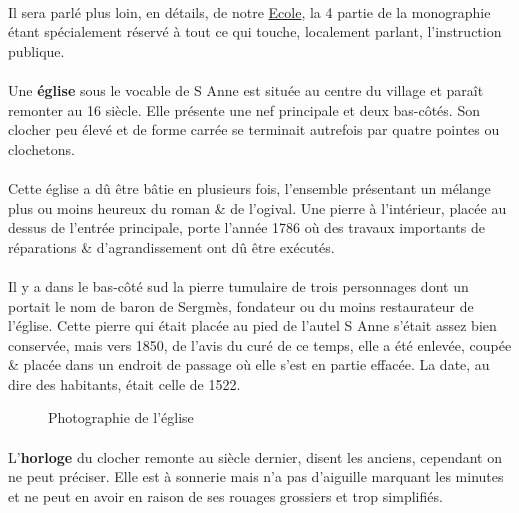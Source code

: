 \documentclass[../eBook.tex]{subfiles}
\begin{document}
    \paragraph{}Il sera parlé plus loin, en détails, de notre \underline{Ecole}, la 4 partie de la monographie étant spécialement réservé à tout ce qui touche, localement parlant, l'instruction publique.
    \paragraph{}Une \textbf{église} sous le vocable de S Anne est située au centre du village et paraît remonter au 16 siècle. Elle présente une nef principale et deux bas-côtés. Son clocher peu élevé et de forme carrée se terminait autrefois par quatre pointes ou clochetons.
    \paragraph{}Cette église a dû être bâtie en plusieurs fois, l'ensemble présentant un mélange plus ou moins heureux du roman \& de l'ogival. Une pierre à l'intérieur, placée au dessus de l'entrée principale, porte l'année 1786 où des travaux importants de réparations \& d'agrandissement ont dû être exécutés.
    \paragraph{}Il y a dans le bas-côté sud la pierre tumulaire de trois personnages dont un portait le nom de baron de Sergmès, fondateur ou du moins restaurateur de l'église. Cette pierre qui était placée au pied de l'autel S Anne s'était assez bien conservée, mais vers 1850, de l'avis du curé de ce temps, elle a été enlevée, coupée \& placée dans un endroit de passage où elle s'est en partie effacée. La date, au dire des habitants, était celle de 1522.
    \begin{center}
       \begin{figure}[!ht]
        \caption*{Photographie de l'église}
      \end{figure}
     \end{center}
    \paragraph{}L'\textbf{horloge} du clocher remonte au siècle dernier, disent les anciens, cependant on ne peut préciser. Elle est à sonnerie mais n'a pas d'aiguille marquant les minutes et ne peut en avoir en raison de ses rouages grossiers et trop simplifiés.
\end{document}
